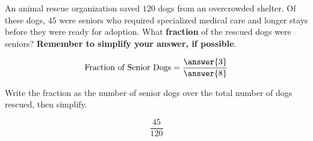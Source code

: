 \documentclass{ximera}[font=12pt]  %
\begin{document}
\begin{problem}
An animal rescue organization saved $120$ dogs from an overcrowded shelter.  Of these dogs, $45$ were seniors who required specialized 
medical care and longer stays before they were ready for adoption.  What \textbf{fraction} of the rescued dogs were seniors?  
\textbf{Remember to simplify your answer, if possible}.

\[ \text{Fraction of Senior Dogs} = \frac{\answer{3}}{\answer{8}} \]

\begin{hint}
Write the fraction as the number of senior dogs over the total number of dogs rescued, then simplify.

\[ \frac{45}{120} \]
\end{hint}
\end{problem}
\end{document}
